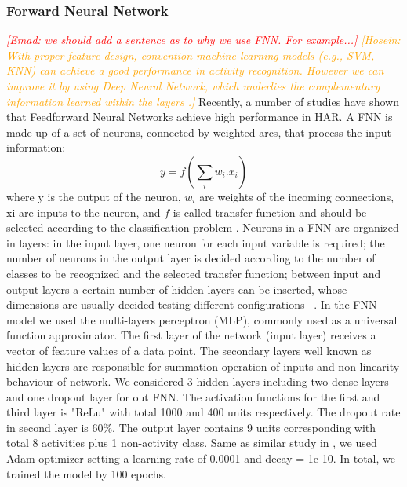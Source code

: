 \documentclass[journal,article,submit,moreauthors,pdftex]{Definitions/mdpi}
\newcommand{\emad}[1]{\textcolor{red}{{\it [Emad: #1]}}}
\newcommand{\hosein}[1]{\textcolor{orange}{{\it [Hosein: #1]}}}
\begin{document}
\subsubsection{Forward Neural Network}
\emad{we should add a sentence as to why we use FNN. For example...}
\hosein{With proper feature design, convention machine learning models (e.g., SVM, KNN) can achieve a good performance in activity recognition. However we can improve it by using Deep Neural Network, which underlies the complementary information learned within the layers \cite{chen2018distilling}.}
Recently, a number of studies have shown that Feedforward Neural Networks achieve high performance in HAR\cite{chen2018distilling, zhu2009human}. A FNN is made up of a set of neurons, connected by weighted arcs, that process the input
information:
\begin{equation}\label{fnn_formula}
 y = f(\sum_{i}^{}w_{i}.x_{i})
\end{equation}
where y is the output of the neuron, $ w_{i} $ are weights of the incoming connections, xi are inputs to the neuron, and $f$ is called transfer function and should be selected according to the classification problem \cite{zhang1999geometrical}. Neurons in a FNN are organized in layers: in the input layer, one neuron for each input variable is required; the number of neurons in the output layer is decided according to the number of classes to be recognized and the selected transfer function; between input and output layers a certain number of hidden layers can be inserted, whose dimensions are usually decided testing different configurations ~\cite{baldominos2019comparison}. 
In the FNN model we used the multi-layers perceptron (MLP), commonly used as a universal function approximator. The first layer of the network (input layer) receives a vector of feature values of a data point. The secondary layers well known as hidden layers are responsible for summation operation of inputs and non-linearity behaviour of network. We considered 3 hidden layers including two dense layers and one dropout layer for out FNN. The activation functions for the first and third layer is "ReLu" \cite{nair2010rectified} with total 1000 and 400 units respectively. The dropout rate in second layer is 60\%. The output layer contains 9 units corresponding with total 8 activities plus 1 non-activity class. Same as similar study in \cite{baldominos2019comparison}, we used Adam optimizer setting a learning rate of 0.0001 and decay = 1e-10. In total, we trained the model by 100 epochs.
\end{document}
